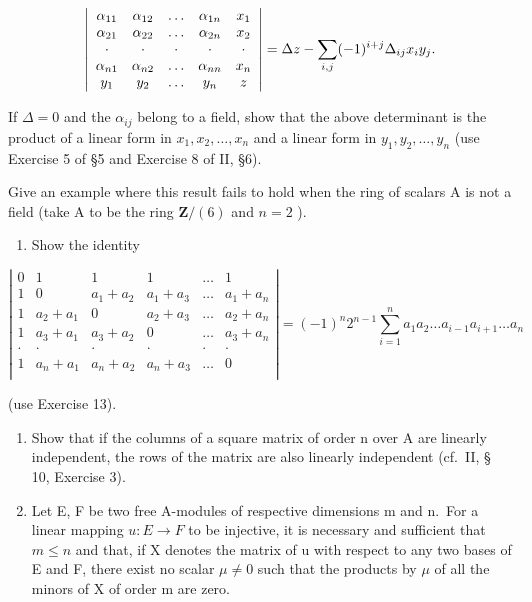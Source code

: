 \[
\left| \begin{array}{c c c c c} \alpha_ {1 1} & \alpha_ {1 2} & \ldots & \alpha_ {1 n} & x _ {1} \\ \alpha_ {2 1} & \alpha_ {2 2} & \ldots & \alpha_ {2 n} & x _ {2} \\ \cdot & \cdot & \cdot & \cdot & \cdot \\ \alpha_ {n 1} & \alpha_ {n 2} & \ldots & \alpha_ {n n} & x _ {n} \\ y _ {1} & y _ {2} & \ldots & y _ {n} & z \end{array} \right| = \Delta z - \sum_ {i, j} (- 1) ^ {i + j} \Delta_ {i j} x _ {i} y _ {j}.
\]

If \(\Delta = 0\) and the \(\alpha_{ij}\) belong to a field, show that the above determinant is the product of a linear form in \(x_1, x_2, \ldots, x_n\) and a linear form in \(y_1, y_2, \ldots, y_n\) (use Exercise 5 of §5 and Exercise 8 of II, §6).

Give an example where this result fails to hold when the ring of scalars A is not a field (take A to be the ring \(\mathbf{Z} / (6)\) and \(n = 2\) ).

\begin{enumerate}
\def\labelenumi{\arabic{enumi}.}
\setcounter{enumi}{13}
\tightlist
\item
  Show the identity
\end{enumerate}

\[
\left| \begin{array}{cccccc} 0 & 1 & 1 & 1 & \ldots & 1 \\ 1 & 0 & a _ {1} + a _ {2} & a _ {1} + a _ {3} & \ldots & a _ {1} + a _ {n} \\ 1 & a _ {2} + a _ {1} & 0 & a _ {2} + a _ {3} & \ldots & a _ {2} + a _ {n} \\ 1 & a _ {3} + a _ {1} & a _ {3} + a _ {2} & 0 & \ldots & a _ {3} + a _ {n} \\ \cdot & \cdot & \cdot & \cdot & \cdot & \cdot \\ 1 & a _ {n} + a _ {1} & a _ {n} + a _ {2} & a _ {n} + a _ {3} & \ldots & 0 \\ \end{array} \right| = (- 1) ^ {n} 2 ^ {n - 1} \sum_ {i = 1} ^ {n} a _ {1} a _ {2} \ldots a _ {i - 1} a _ {i + 1} \ldots a _ {n}
\]

(use Exercise 13).

\begin{enumerate}
\def\labelenumi{\arabic{enumi}.}
\setcounter{enumi}{14}
\item
  Show that if the columns of a square matrix of order n over A are linearly independent, the rows of the matrix are also linearly independent (cf.~II, § 10, Exercise 3).
\item
  Let E, F be two free A-modules of respective dimensions m and n.~For a linear mapping \(u: E \rightarrow F\) to be injective, it is necessary and sufficient that \(m \leqslant n\) and that, if X denotes the matrix of u with respect to any two bases of E and F, there exist no scalar \(\mu \neq 0\) such that the products by \(\mu\) of all the minors of X of order m are zero.
\end{enumerate}

